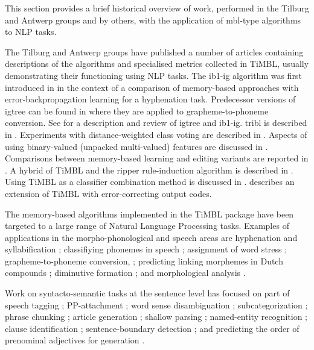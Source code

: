 \documentclass{report}
\begin{document}
This section provides a brief historical overview of work, performed
in the Tilburg and Antwerp groups and by others, with the application
of {\sc mbl}-type algorithms to NLP tasks.

The Tilburg and Antwerp groups have published a number of articles
containing descriptions of the algorithms and specialised metrics
collected in TiMBL, usually demonstrating their functioning using NLP
tasks. The {\sc ib1-ig} algorithm was first introduced in
\cite{Daelemans+92b} in the context of a comparison of memory-based
approaches with error-back\-propagation learning for a hyphenation
task.  Predecessor versions of {\sc igtree} can be found in
\cite{Daelemans+93c,VandenBosch+93} where they are applied to
grapheme-to-phoneme conversion.  See \cite{Daelemans+97} for a
description and review of {\sc igtree} and {\sc ib1-ig}. {\sc tribl}
is described in \cite{Daelemans+97d}.  Experiments with
distance-weighted class voting are described in
\cite{Zavrel97}. Aspects of using binary-valued (unpacked
multi-valued) features are discussed in \cite{VandenBosch+00}.
Comparisons between memory-based learning and editing variants are
reported in \cite{VandenBosch99,Daelemans+99}. A hybrid of TiMBL and
the {\sc ripper} rule-induction algorithm \cite{Cohen95} is described
in \cite{VandenBosch00}. Using TiMBL as a classifier combination
method is discussed in \cite{Halteren+01}. 
describes an extension of TiMBL with error-correcting output codes.

The memory-based algorithms implemented in the TiMBL package have been
targeted to a large range of Natural Language Processing
tasks. Examples of applications in the morpho-phonological and speech areas are
hyphenation and syllabification \cite{Daelemans+92b}; classifiying
phonemes in speech \cite{Kocsor+00}; assignment of word stress
\cite{Daelemans+94b}; grapheme-to-phoneme conversion,
\cite{VandenBosch+93,Daelemans+96}; predicting linking morphemes in
Dutch compounds \cite{Krott+01}; diminutive formation
\cite{Daelemans+98a}; and morphological analysis
\cite{VandenBosch+96,VandenBosch+99}.

Work on syntacto-semantic tasks at the sentence level has  focused on
part of speech tagging \cite{Daelemans+96b,Zavrel+99,Halteren+01};
PP-attachment \cite{Zavrel+97b}; word sense disambiguation
\cite{Veenstra+00,Stevenson+99,Kokkinakis00}; subcategorization
\cite{Buchholz98}; phrase chunking \cite{Veenstra98,Sang+99}; article
generation \cite{Minnen+00}; shallow parsing
\cite{Daelemans+99a,Buchholz+99,Yeh00}; named-entity recognition
\cite{Buchholz+00}; clause identification \cite{Orasan00,Sang01};
sentence-boundary detection \cite{Stevenson+00}; and predicting the
order of prenominal adjectives for generation \cite{Malouf00}.
\end{document}
